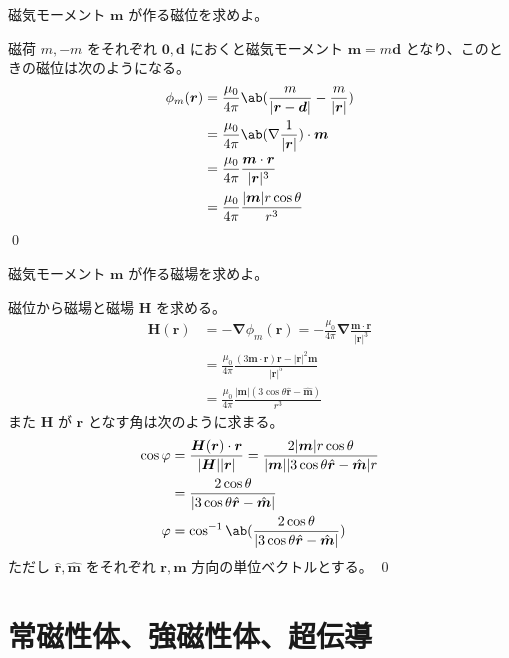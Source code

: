 \documentclass[uplatex,dvipdfmx,a4paper,11pt]{jlreq}
\makeatletter
\newcommand{\HH}{\bm{H}}
\newcommand{\rr}{\bm{r}}
\newcommand{\mm}{\bm{m}}
\newcommand{\vnabla}{\mathbf{\nabla}}
\numberwithin{equation}{section}
\theoremstyle{definition}
\renewenvironment{proof}[1][\proofname]{\par
  \normalfont
  \topsep6\p@\@plus6\p@ \trivlist
  \item[\hskip\labelsep{\bfseries #1}\@addpunct{\bfseries}]\ignorespaces\quad\par
}{%
  \qed\endtrivlist\@endpefalse
}
\renewcommand\proofname{証明}
\makeatother
\begin{document}
\begin{problem}
磁気モーメント $\bm{m}$ が作る磁位を求めよ。
\end{problem}
\begin{proof}
  磁荷 $m, -m$ をそれぞれ $\bm{0}, \bm{d}$ におくと磁気モーメント $\mm = m\bm{d}$ となり、このときの磁位は次のようになる。
  \begin{align}
    \phi_m(\rr) & = \frac{\mu_0}{4\pi}\ab(\frac{m}{|\rr - \bm{d}|} - \frac{m}{|\rr|}) \\
                & = \frac{\mu_0}{4\pi}\ab(\vnabla\frac{1}{|\rr|})\cdot\mm             \\
                & = \frac{\mu_0}{4\pi}\frac{\mm\cdot\rr}{|\rr|^3}                     \\
                & = \frac{\mu_0}{4\pi}\frac{|\mm|r\cos\theta}{r^3}
  \end{align}
\end{proof}

\begin{problem}
磁気モーメント $\bm{m}$ が作る磁場を求めよ。
\end{problem}
\begin{proof}
  磁位から磁場と磁場 $\HH$ を求める。
  \begin{align}
    \HH(\rr) & = -\vnabla\phi_m(\rr) = -\frac{\mu_0}{4\pi}\vnabla\frac{\mm\cdot\rr}{|\rr|^3} \\
             & = \frac{\mu_0}{4\pi}\frac{(3\mm\cdot\rr)\rr - |\rr|^2\mm}{|\rr|^5}            \\
             & = \frac{\mu_0}{4\pi}\frac{|\mm|(3\cos\theta\hat{\rr} - \hat{\mm})}{r^3}
  \end{align}
  また $\HH$ が $\rr$ となす角は次のように求まる。
  \begin{align}
    \cos\varphi & = \frac{\HH(\rr)\cdot\rr}{|\HH||\rr|} = \frac{2|\mm|r\cos\theta}{|\mm||3\cos\theta\hat{\rr} - \hat{\mm}|r} \\
                & = \frac{2\cos\theta}{|3\cos\theta\hat{\rr} - \hat{\mm}|}                                                   \\
    \varphi     & = \cos^{-1}\ab(\frac{2\cos\theta}{|3\cos\theta\hat{\rr} - \hat{\mm}|})
  \end{align}
  ただし $\hat{\rr}, \hat{\mm}$ をそれぞれ $\rr, \mm$ 方向の単位ベクトルとする。
\end{proof}



\section{常磁性体、強磁性体、超伝導}
\end{document}
